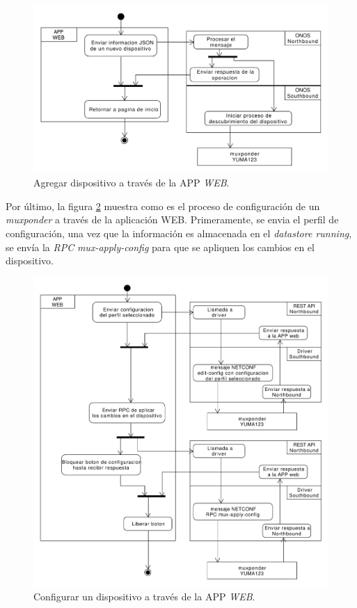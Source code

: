 \begin{itemize}
    \begin{figure}[H]
        \centering
        \includegraphics[scale=0.45]{Figures/agregar_disp_web.pdf}
        \caption{Agregar dispositivo a través de la APP \textit{WEB}.}
        \label{fig:agregar_disp_web}
      \end{figure}

    Por último, la figura \ref{fig:config_disp_web} muestra como es el proceso de configuración de un \textit{muxponder} a través de la aplicación WEB. Primeramente, se envia el perfil de configuración, una vez que la información es almacenada en el \textit{datastore running}, se envía la \textit{RPC} \textit{mux-apply-config} para que se apliquen los cambios en el dispositivo.

    \begin{figure}[H]
        \centering
        \includegraphics[scale=0.45]{Figures/config_disp_web.pdf}
        \caption{Configurar un dispositivo a través de la APP \textit{WEB}.}
        \label{fig:config_disp_web}
      \end{figure}


\end{itemize}
